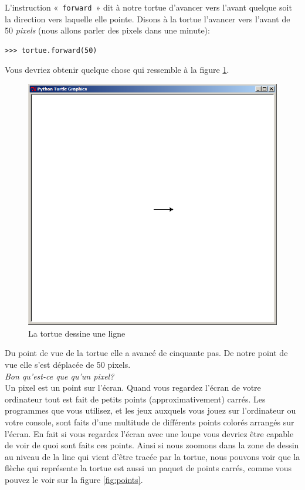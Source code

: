 L'instruction «~\texttt{forward}~» dit à notre tortue d'avancer vers l'avant quelque soit la direction vers laquelle elle pointe. Disons à la tortue l'avancer vers l'avant de 50 \emph{pixels} (nous allons parler des pixels dans une minute):

\begin{Verbatim}[frame=single,rulecolor=\color{mbleu}, label=à taper]
>>> tortue.forward(50)
\end{Verbatim}

Vous devriez obtenir quelque chose qui ressemble à la figure \ref{fig:50px}.

\begin{figure}[h!]
\centering
\includegraphics[scale=0.4]{images/50px.png}
\caption{La tortue dessine une ligne}
\label{fig:50px}
\end{figure}

Du point de vue de la tortue elle a avancé de cinquante pas. De notre point de vue elle s'est déplacée  de 50 pixels.\\


\emph{Bon qu'est-ce que qu'un pixel?}\\

Un pixel est un point sur l'écran. Quand vous regardez l'écran de votre ordinateur tout est fait de petits points (approximativement) carrés. Les programmes que vous utilisez, et les jeux auxquels vous jouez sur l'ordinateur ou votre console, sont faits d'une multitude de différents points colorés arrangés sur l'écran. En fait si vous regardez l'écran avec une loupe vous devriez être capable de voir de quoi sont faits ces points. Ainsi si nous zoomons dans la zone de dessin au niveau de la line qui vient d'être tracée par la tortue, nous pouvons voir que la flèche qui représente la tortue est aussi un paquet de points carrés, comme vous pouvez le voir sur la figure \ref{fig:points}.

